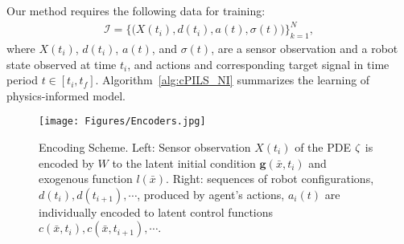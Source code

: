 Our method requires the following data for training:
\begin{align}
\mathcal{I}=\{\bigl(X(t_i), d(t_i), a(t), \sigma(t)\bigr)\}_{k=1}^N,\label{eq:dataset}   
\end{align}
where $X(t_i)$, $d(t_i)$, $a(t)$, and $\sigma(t)$, are a sensor observation and a robot state observed at time $t_i$, and actions and corresponding target signal in time period $t\in \left[t_i, t_{f} \right]$. Algorithm~\ref{alg:cPILS_NI} summarizes the learning of physics-informed model. 

\begin{figure}[t!]
\centering
\texttt{[image: Figures/Encoders.jpg]}
\caption{Encoding Scheme. Left: Sensor observation $X(t_i)$ of the PDE $\zeta$ is encoded by $W$ to the latent initial condition $\mathbf{g}(\bar{x}, t_i)$ and exogenous function $l(\bar{x})$. Right: sequences of robot configurations, $d(t_i), d(t_{i+1}), \cdots$, produced by agent's actions, $a_i(t)$ are individually encoded to latent control functions $c(\bar{x}, t_i), c(\bar{x}, t_{i+1}), \cdots$.}\label{fig:Encoders}
\end{figure}
